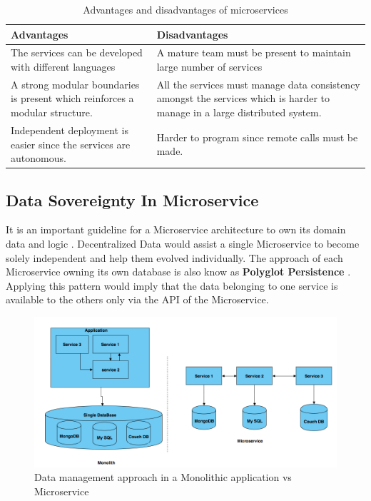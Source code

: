     \begin{table}[h!]
        \centering
        \begin{tabular}{|p{9cm}|p{7.5cm}|}
            \hline
                \textbf{Advantages}  & \textbf{Disadvantages}\\
            \hline
                The services can be developed with different languages & 
                A mature team must be present to maintain large number of services \\
            \hline
                A strong modular boundaries is present which reinforces a modular
                structure.
                & All the services must manage data consistency amongst the services which is
                harder to manage in a large distributed system.\\
            \hline
                 Independent deployment is easier since the services are
                 autonomous. & Harder to program since remote calls must be made.\\
            \hline
        \end{tabular}
        \caption{Advantages and disadvantages of microservices \cite{FowlerMartin}}
        \label{table:Advantages and disadvantages of microservices}     
    \end{table}    

    \newpage
    \subsection{Data Sovereignty In Microservice}
    \label{subsection:dataSovereignty}
    It is an important guideline for a Microservice architecture to own its domain data and 
    logic \cite[p.~29]{Torre2017}. Decentralized Data would assist a single Microservice
    to become solely independent and help them evolved individually. The approach of each Microservice owning its own database is also
    know as \textbf{Polyglot Persistence} \cite{Polyglot}. Applying this pattern would imply that the
    data belonging to one service is available to the others only via the API of the Microservice.

    \begin{figure}[H]
        \centering \includegraphics[scale=0.4]{grafiken/polyglot.png}
        \caption{Data management approach in a Monolithic application vs Microservice \cite{FowlerMartin}}
        \label{fig:polyglot}
    \end{figure}
    
